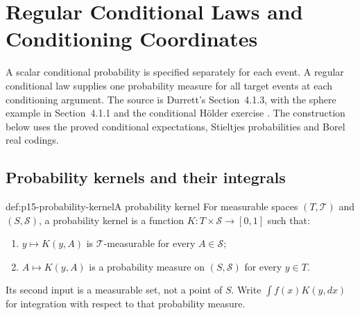 \chapter{Regular Conditional Laws and Conditioning Coordinates}
\label{sec:p15-regular-conditional-laws}

A scalar conditional probability is specified separately for each event.
A regular conditional law supplies one probability measure for all target
events at each conditioning argument. The source is Durrett's
Section~4.1.3, with the sphere example in Section~4.1.1 and the conditional
H\"older exercise \cite[pp.~210, 214--216]{DurrettPTEAuthor2019}.
The construction below uses the proved conditional expectations, Stieltjes
probabilities and Borel real codings.

\section{Probability kernels and their integrals}
\label{sec:p15-conditional-kernels}

\begin{hbdefinition}{def:p15-probability-kernel}{A probability kernel}
For measurable spaces \((T,\mathcal T)\) and \((S,\mathcal S)\), a
probability kernel is a function
\(K:T\times\mathcal S\to[0,1]\) such that:
\begin{enumerate}
\item \(y\mapsto K(y,A)\) is \(\mathcal T\)-measurable for every
      \(A\in\mathcal S\);
\item \(A\mapsto K(y,A)\) is a probability measure on \((S,\mathcal S)\)
      for every \(y\in T\).
\end{enumerate}
Its second input is a measurable set, not a point of \(S\).
Write \(\int f(x)K(y,dx)\) for integration with respect to that
probability measure.
\end{hbdefinition}

